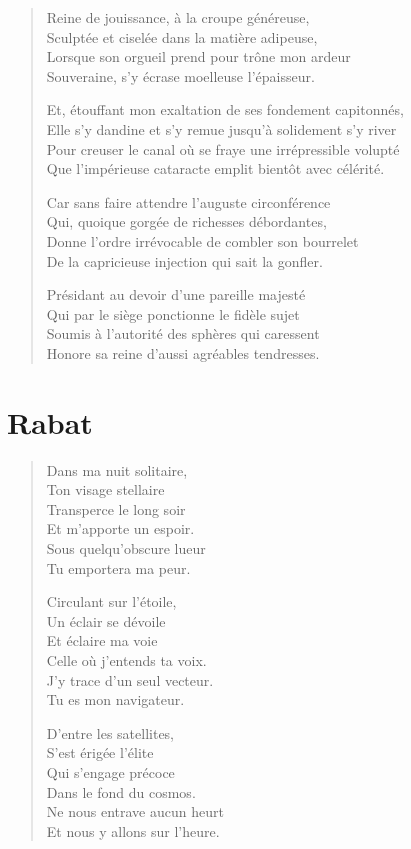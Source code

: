 \begin{verse}
Reine de jouissance, à la croupe généreuse,\\
Sculptée et ciselée dans la matière adipeuse,\\
Lorsque son orgueil prend pour trône mon ardeur\\
Souveraine, s’y écrase moelleuse l’épaisseur.

Et, étouffant mon exaltation de ses fondement capitonnés,\\
Elle s’y dandine et s’y remue jusqu’à solidement s’y river\\
Pour creuser le canal où se fraye une irrépressible volupté\\
Que l’impérieuse cataracte emplit bientôt avec célérité.

Car sans faire attendre l’auguste circonférence\\
Qui, quoique gorgée de richesses débordantes,\\
Donne l’ordre irrévocable de combler son bourrelet\\
De la capricieuse injection qui sait la gonfler.

Présidant au devoir d’une pareille majesté\\
Qui par le siège ponctionne le fidèle sujet\\
Soumis à l’autorité des sphères qui caressent\\
Honore sa reine d’aussi agréables tendresses.
\end{verse}

\newpage
\section*{Rabat}

\begin{verse}
Dans ma nuit solitaire,\\
Ton visage stellaire\\
Transperce le long soir\\
Et m’apporte un espoir.\\
Sous quelqu’obscure lueur\\
Tu emportera ma peur.

Circulant sur l’étoile,\\
Un éclair se dévoile\\
Et éclaire ma voie\\
Celle où j’entends ta voix.\\
J’y trace d’un seul vecteur.\\
Tu es mon navigateur.

D’entre les satellites,\\
S’est érigée l’élite\\
Qui s’engage précoce\\
Dans le fond du cosmos.\\
Ne nous entrave aucun heurt\\
Et nous y allons sur l’heure.
\end{verse}

